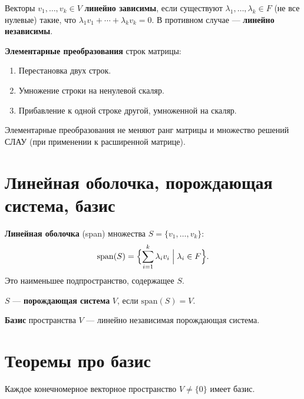 \documentclass[12pt]{article}
\begin{document}
\begin{definition}
Векторы $v_1, \ldots, v_k \in V$ \textbf{линейно зависимы}, если
существуют $\lambda_1,\ldots,\lambda_k \in F$ (не все нулевые) такие, что
$\lambda_1 v_1 + \cdots + \lambda_k v_k = 0$.
В противном случае --- \textbf{линейно независимы}.
\end{definition}

\begin{definition}
\textbf{Элементарные преобразования} строк матрицы:
\begin{enumerate}[(Э1)]
\item Перестановка двух строк.
\item Умножение строки на ненулевой скаляр.
\item Прибавление к одной строке другой, умноженной на скаляр.
\end{enumerate}
Элементарные преобразования не меняют ранг матрицы и множество
решений СЛАУ (при применении к расширенной матрице).
\end{definition}

\section{Линейная оболочка, порождающая система, базис}

\begin{definition}
\textbf{Линейная оболочка} (span) множества $S = \{v_1,\ldots,v_k\}$:
\[
\mathrm{span}(S) = \Bigl\{\sum_{i=1}^k \lambda_i v_i \Bigm| \lambda_i \in F\Bigr\}.
\]
Это наименьшее подпространство, содержащее $S$.
\end{definition}

\begin{definition}
$S$ --- \textbf{порождающая система} $V$, если $\mathrm{span}(S) = V$.
\end{definition}

\begin{definition}
\textbf{Базис} пространства $V$ --- линейно независимая порождающая система.
\end{definition}

\section{Теоремы про базис}

\begin{theorem}
Каждое конечномерное векторное пространство $V \neq \{0\}$ имеет базис.
\end{theorem}
\end{document}
